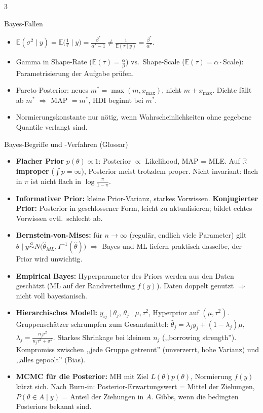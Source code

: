 \documentclass[8pt,a4paper,landscape]{extarticle}
\newcommand{\E}{\mathbb{E}}
\newcommand{\asim}{\overset{a}{\sim}}
\newcommand{\ra}{$\Rightarrow$}
\begin{document}
\begin{multicols*}{3}
\begin{falle}{Bayes-Fallen}
\begin{itemize}
\item $\E(\sigma^2\mid y)=\E\big(\frac1\tau\mid y\big)=\frac{\beta^*}{\alpha^*-1}\neq\frac{1}{\E(\tau\mid y)}=\frac{\beta^*}{\alpha^*}$.
\item Gamma in Shape-Rate ($\E(\tau)=\frac\alpha\beta$) vs.\ Shape-Scale ($\E(\tau)=\alpha\cdot$Scale): Parametrisierung der Aufgabe prüfen.
\item Pareto-Posterior: neues $m^*=\max(m,x_{\max})$, nicht $m+x_{\max}$. Dichte fällt ab $m^*$ \ra{} MAP $=m^*$, HDI beginnt bei $m^*$.
\item Normierungskonstante nur nötig, wenn Wahrscheinlichkeiten ohne gegebene Quantile verlangt sind.
\end{itemize}
\end{falle}
\begin{wissen}{Bayes-Begriffe und -Verfahren (Glossar)}
\begin{itemize}
\item \textbf{Flacher Prior} $p(\theta)\propto 1$: Posterior $\propto$ Likelihood, MAP = MLE. Auf $\mathbb R$ \textbf{improper} ($\int p=\infty$), Posterior meist trotzdem proper. Nicht invariant: flach in $\pi$ ist nicht flach in $\log\frac{\pi}{1-\pi}$.
\item \textbf{Informativer Prior:} kleine Prior-Varianz, starkes Vorwissen. \textbf{Konjugierter Prior:} Posterior in geschlossener Form, leicht zu aktualisieren; bildet echtes Vorwissen evtl.\ schlecht ab.
\item \textbf{Bernstein-von-Mises:} für $n\to\infty$ (regulär, endlich viele Parameter) gilt $\theta\mid y\asim N\big(\hat\theta_{ML},I^{-1}(\hat\theta)\big)$ \ra{} Bayes und ML liefern praktisch dasselbe, der Prior wird unwichtig.
\item \textbf{Empirical Bayes:} Hyperparameter des Priors werden aus den Daten geschätzt (ML auf der Randverteilung $f(y)$). Daten doppelt genutzt \ra{} nicht voll bayesianisch.
\item \textbf{Hierarchisches Modell:} $y_{ij}\mid\theta_j$, $\theta_j\mid\mu,\tau^2$, Hyperprior auf $(\mu,\tau^2)$. Gruppenschätzer schrumpfen zum Gesamtmittel: $\hat\theta_j=\lambda_j\bar y_j+(1-\lambda_j)\mu$, $\lambda_j=\frac{n_j\tau^2}{n_j\tau^2+\sigma^2}$. Starkes Shrinkage bei kleinem $n_j$ (,,borrowing strength''). Kompromiss zwischen ,,jede Gruppe getrennt'' (unverzerrt, hohe Varianz) und ,,alles gepoolt'' (Bias).
\item \textbf{MCMC für die Posterior:} MH mit Ziel $L(\theta)p(\theta)$, Normierung $f(y)$ kürzt sich. Nach Burn-in: Posterior-Erwartungswert = Mittel der Ziehungen, $P(\theta\in A\mid y)$ = Anteil der Ziehungen in $A$. Gibbs, wenn die bedingten Posteriors bekannt sind.

\end{itemize}
\end{wissen}
\end{multicols*}
\end{document}
